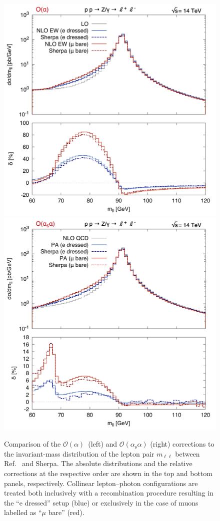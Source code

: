 \documentclass[11pt]{cernrep}
\newcommand{\order}{\ensuremath{\mathcal{O}}}
\newcommand{\alphas}{\ensuremath{\alpha_\mathrm{s}}}
\DeclareRobustCommand{\Pl}{{\ensuremath{\ell}}}
\begin{document}
\begin{figure}
  \includegraphics[width=.48\linewidth]{images/Z_mll2_LO.pdf} \hfill
  \includegraphics[width=.48\linewidth]{images/Z_mll2_NLO.pdf} 
  \caption{
    Comparison of the $\order(\alpha)$~(left) and $\order(\alphas\alpha)$ 
    (right) corrections to the invariant-mass distribution of the lepton 
    pair $m_{\Pl\Pl}$ between Ref.~\cite{Dittmaier:2015rxo} and Sherpa. 
    The absolute distributions and the relative corrections at the 
    respective order are shown in the top and bottom panels, respectively. 
    Collinear lepton--photon configurations are treated both inclusively 
    with a recombination procedure resulting in the ``e dressed'' setup 
    (blue) or exclusively in the case of muons labelled as ``$\mu$ bare'' 
    (red).
  }
  \label{fig:dyew:mll}
\end{figure}
\end{document}
